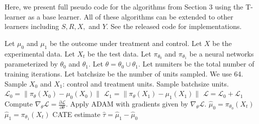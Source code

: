 Here, we present full pseudo code for the algorithms from Section 3 using the T-learner as a base learner. All of these algorithms can be extended to other learners including $S, R, X,$ and $Y$. See the released code for implementations. 

\begin{algorithm}[H]
\caption{Vanilla T-learner}
\label{alg:vanilla-t}
\begin{algorithmic}[1]
\STATE Let $\mu_0$ and $\mu_1$ be the outcome under treatment and control. 
\STATE Let $X$ be the experimental data. Let $X_t$ be the test data. 
\STATE Let $\pi_{\theta_0}$ and $\pi_{\theta_1}$ be a neural networks parameterized by $\theta_0$ and $\theta_1$. 
\STATE Let $\theta = \theta_0 \cup \theta_1$. 
\STATE Let numiters be the total number of training iterations.
\STATE Let batchsize be the number of units sampled. We use 64. 
\STATE Sample $X_0$ and $X_1$: control and treatment units. Sample batchsize units.  
\STATE $\mathcal{L}_0= \| \pi_\theta (X_0) - \mu_0(X_0) \| $
\STATE $\mathcal{L}_1 = \| \pi_\theta (X_1) - \mu_1(X_1) \| $
\STATE $\mathcal{L} = \mathcal{L}_0 + \mathcal{L}_1$
\STATE Compute $\nabla_{\theta} \mathcal{L} = \frac{\partial \mathcal{L}}{\partial \theta}$.
\STATE Apply ADAM with gradients given by $\nabla_{\theta} \mathcal{L}$. 
\ENDFOR
\STATE $\hat{\mu}_0 = \pi_{\theta_0} (X_t)$
\STATE $\hat{\mu}_1 = \pi_{\theta_1} (X_t)$
 CATE estimate $\hat{\tau} = \hat{\mu}_1 - \hat{\mu}_0$
\end{algorithmic}
\end{algorithm}

